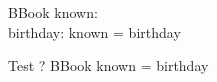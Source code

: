 

\begin{schema}{BBook}
   known: \power \nat \\
   birthday: \nat \pfun \nat
\where
   known = \dom birthday
\end{schema}

\begin{theorem}{Test}
    \vdash?  BBook \implies known = \dom birthday
\end{theorem}
